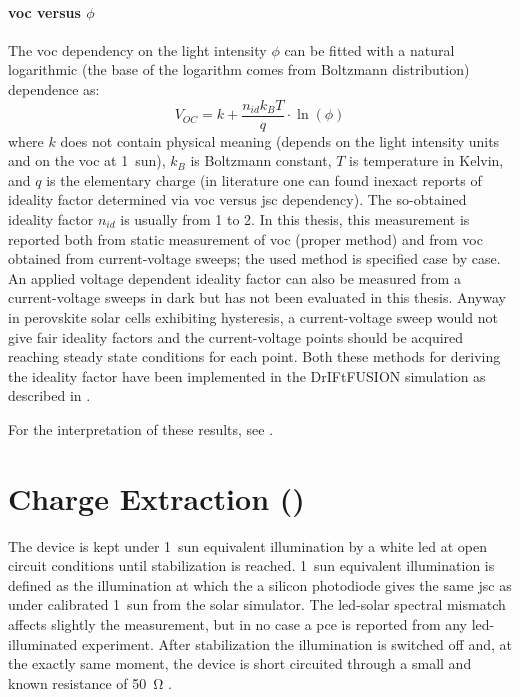 \paragraph{\Gls{voc} versus $\phi$}\label{methods_voc_intensity} The \gls{voc} dependency on the light intensity $\phi$ can be fitted with a natural logarithmic (the base of the logarithm comes from Boltzmann distribution) dependence as:
$$V_{OC} = k + \frac{n_{id} k_B T}{q}\cdot\ln(\phi)$$
where $k$ does not contain physical meaning (depends on the light intensity units and on the \gls{voc} at 1~sun), $k_B$ is Boltzmann constant, $T$ is temperature in Kelvin, and $q$ is the elementary charge\cite{Calado2018b} (in literature one can found inexact reports of ideality factor determined via \gls{voc} versus \gls{jsc} dependency). The so-obtained ideality factor $n_{id}$ is usually from 1 to 2. In this thesis, this measurement is reported both from static measurement of \gls{voc} (proper method) and from \gls{voc} obtained from current-voltage sweeps; the used method is specified case by case.	An applied voltage dependent ideality factor can also be measured from a current-voltage sweeps in dark but has not been evaluated in this thesis. Anyway in perovskite solar cells exhibiting hysteresis, a current-voltage sweep would not give fair ideality factors and the current-voltage points should be acquired reaching steady state conditions for each point. Both these methods for deriving the ideality factor have been implemented in the DrIFtFUSION simulation as described in .

For the interpretation of these results, see .

\section{Charge Extraction ()}

The device is kept under 1~sun equivalent illumination by a white \gls{led} at open circuit conditions until stabilization is reached. 1~sun equivalent illumination is defined as the illumination at which the a silicon photodiode gives the same \gls{jsc} as under calibrated 1~sun from the solar simulator. The \gls{led}-solar spectral mismatch affects slightly the measurement, but in no case a \gls{pce} is reported from any \gls{led}-illuminated experiment. After stabilization the illumination is switched off and, at the exactly same moment, the device is short circuited through a small and known resistance of \SI{50}{\ohm} \cite{Duffy2000}.

